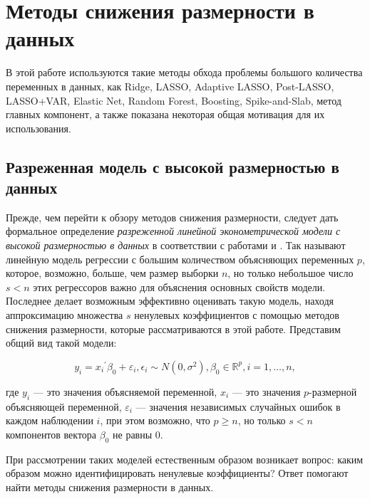\chapter{Методы снижения размерности в данных} \label{ch:models}
В этой работе используются такие методы обхода проблемы большого количества переменных в данных, как Ridge, LASSO, Adaptive LASSO, Post-LASSO, LASSO+VAR, Elastic Net, Random Forest, Boosting, Spike-and-Slab, метод главных компонент, а также показана некоторая общая мотивация для их использования.
\section{Разреженная модель с высокой размерностью в данных}
Прежде, чем перейти к обзору методов снижения
размерности, следует дать формальное определение \textit{разреженной линейной
эконометрической модели с высокой размерностью в данных} в соответствии с работами \cite{belloni2011high} и \cite{belloni2011ℓ1}. Так называют линейную
модель регрессии с большим количеством объясняющих переменных $p$, которое,
возможно, больше, чем размер выборки $n$, но только небольшое число $s<n$ этих
регрессоров важно для объяснения основных свойств модели. Последнее делает
возможным эффективно оценивать такую модель, находя аппроксимацию множества $s$
ненулевых коэффициентов с помощью методов снижения размерности, которые
рассматриваются в этой работе. Представим общий вид такой модели: 


\begin{equation} y_i = {x_i}^{'}
\beta_0 + \varepsilon_i, \epsilon_i \sim N(0, \sigma^2), \beta_0 \in
\mathbb{R}^p, i = 1, \dots, n, \end{equation} 

где $y_i$ --- это значения объясняемой
переменной, $x_i$ --- это значения $p$-размерной объясняющей переменной,
$\varepsilon_i$ --- значения независимых случайных ошибок в каждом наблюдении
$i$, при этом возможно, что $p \geq n$, но только $s<n$ компонентов вектора
$\beta_0$ не равны $0$.

При рассмотрении таких моделей естественным образом возникает вопрос: каким
образом можно идентифицировать ненулевые коэффициенты? Ответ помогают найти методы
снижения размерности в данных.

